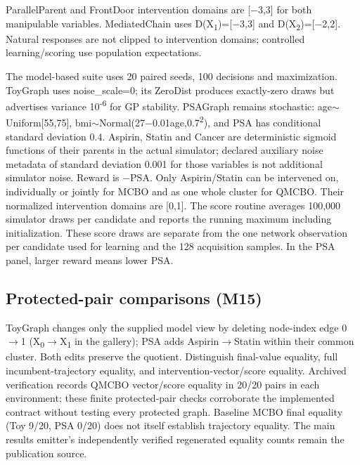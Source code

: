 ParallelParent and FrontDoor intervention domains are [\ensuremath{-}3,3] for both manipulable variables. MediatedChain uses D(X\textsubscript{1})=[\ensuremath{-}3,3] and D(X\textsubscript{2})=[\ensuremath{-}2,2]. Natural responses are not clipped to intervention domains; controlled learning/scoring use population expectations.

The model-based suite uses 20 paired seeds, 100 decisions and maximization. ToyGraph uses noise\_scale=0; its ZeroDist produces exactly-zero draws but advertises variance 10\textsuperscript{-}\textsuperscript{6} for GP stability. PSAGraph remains stochastic: age\ensuremath{\sim}Uniform[55,75], bmi\ensuremath{\sim}Normal(27\ensuremath{-}0.01age,0.7\textsuperscript{2}), and PSA has conditional standard deviation 0.4. Aspirin, Statin and Cancer are deterministic sigmoid functions of their parents in the actual simulator; declared auxiliary noise metadata of standard deviation 0.001 for those variables is not additional simulator noise. Reward is \ensuremath{-}PSA. Only Aspirin/Statin can be intervened on, individually or jointly for MCBO and as one whole cluster for QMCBO. Their normalized intervention domains are [0,1]. The score routine averages 100,000 simulator draws per candidate and reports the running maximum including initialization. These score draws are separate from the one network observation per candidate used for learning and the 128 acquisition samples. In the PSA panel, larger reward means lower PSA.

\subsection*{Protected-pair comparisons (M15)}

ToyGraph changes only the supplied model view by deleting node-index edge 0\ensuremath{\to}1 (X\textsubscript{0}\ensuremath{\to}X\textsubscript{1} in the gallery); PSA adds Aspirin\ensuremath{\to}Statin within their common cluster. Both edits preserve the quotient. Distinguish final-value equality, full incumbent-trajectory equality, and intervention-vector/score equality. Archived verification records QMCBO vector/score equality in 20/20 pairs in each environment; these finite protected-pair checks corroborate the implemented contract without testing every protected graph. Baseline MCBO final equality (Toy 9/20, PSA 0/20) does not itself establish trajectory equality. The main results emitter's independently verified regenerated equality counts remain the publication source.

